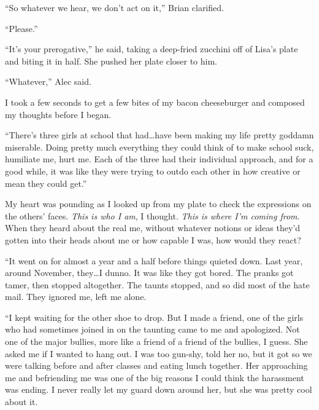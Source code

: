 ``So whatever we hear, we don't act on it,'' Brian clarified.



``Please.''



``It's your prerogative,'' he said, taking a deep-fried zucchini off of Lisa's plate and biting it in half.  She pushed her plate closer to him.



``Whatever,'' Alec said.



I took a few seconds to get a few bites of my bacon cheeseburger and composed my thoughts before I began.



``There's three girls at school that had\ldots have been making my life pretty goddamn miserable.  Doing pretty much everything they could think of to make school suck, humiliate me, hurt me.  Each of the three had their individual approach, and for a good while, it was like they were trying to outdo each other in how creative or mean they could get.''



My heart was pounding as I looked up from my plate to check the expressions on the others' faces.  \emph{This is who I am}, I thought.  \emph{This is where I'm coming from}.  When they heard about the real me, without whatever notions or ideas they'd gotten into their heads about me or how capable I was, how would they react?



``It went on for almost a year and a half before things quieted down.  Last year, around November, they\ldots I dunno.  It was like they got bored.  The pranks got tamer, then stopped altogether.  The taunts stopped, and so did most of the hate mail.  They ignored me, left me alone.



``I kept waiting for the other shoe to drop.  But I made a friend, one of the girls who had sometimes joined in on the taunting came to me and apologized.  Not one of the major bullies, more like a friend of a friend of the bullies, I guess.  She asked me if I wanted to hang out.  I was too gun-shy, told her no, but it got so we were talking before and after classes and eating lunch together.  Her approaching me and befriending me was one of the big reasons I could think the harassment was ending.  I never really let my guard down around her, but she was pretty cool about it.



